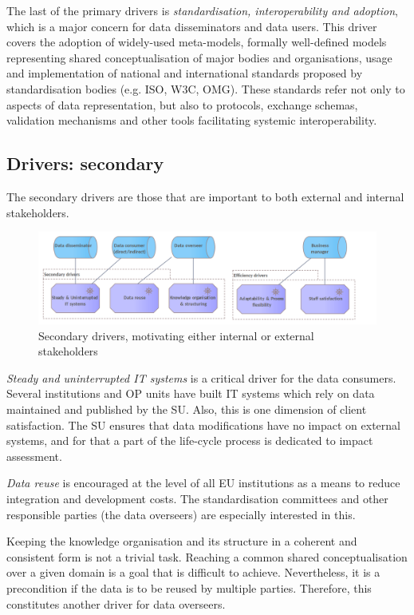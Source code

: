	The last of the primary drivers is \textit{standardisation, interoperability and adoption}, which is a major concern for data disseminators and data users. This driver covers the adoption of widely-used meta-models, formally well-defined models representing shared conceptualisation of major bodies and organisations, usage and implementation of national and international standards proposed by standardisation bodies (e.g. ISO, W3C, OMG). These standards refer not only to aspects of data representation, but also to protocols, exchange schemas, validation mechanisms and other tools facilitating systemic interoperability. 
	
	\subsection{Drivers: secondary}
	The secondary drivers are those that are important to both external and internal stakeholders.
	
	\begin{figure}[h!]
		\centering
		\includegraphics[width=1.05\textwidth]{images/motivation/Secondary drivers.png}
		\caption{Secondary drivers, motivating either internal or external stakeholders}
		\label{fig:secondary drivers}
	\end{figure}

	\textit{Steady and uninterrupted IT systems} is a critical driver for the data consumers. Several institutions and OP units have built IT systems which rely on data maintained and published by the SU. Also, this is one dimension of client satisfaction. The SU ensures that data modifications have no impact on external systems, and for that a part of the life-cycle process is dedicated to impact assessment. 
	
	\textit{Data reuse} is encouraged at the level of all EU institutions as a means to reduce integration and development costs. The standardisation committees and other responsible parties (the data overseers) are especially interested in this. 
	
	Keeping the knowledge organisation and its structure in a coherent and consistent form is not a trivial task. Reaching a common shared conceptualisation over a given domain is a goal that is difficult to achieve. Nevertheless, it is a precondition if the data is to be reused by multiple parties. Therefore, this constitutes another driver for data overseers. 
	
